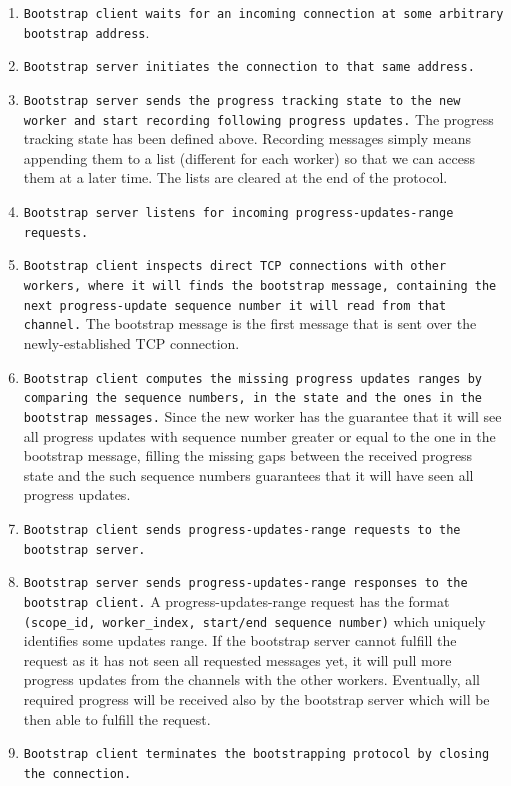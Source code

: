 \documentclass[12pt]{extarticle}
\begin{document}
\begin{enumerate}
    \item \texttt{Bootstrap client waits for an incoming connection at some arbitrary bootstrap address}.

    \item \texttt{Bootstrap server initiates the connection to that same address.}

    \item \texttt{Bootstrap server sends the progress tracking state to the new worker and start recording following progress updates.}
        The progress tracking state has been defined above. Recording messages simply means appending them to a list (different for each worker)
        so that we can access them at a later time. The lists are cleared at the end of the protocol.

    \item \texttt{Bootstrap server listens for incoming progress-updates-range requests.}

    \item \texttt{Bootstrap client inspects direct TCP connections with other workers, where it will finds the bootstrap message, containing the next progress-update sequence number it will read from that channel.}
        The bootstrap message is the first message that is sent over the newly-established TCP connection.

    \item \texttt{Bootstrap client computes the missing progress updates ranges by comparing the sequence numbers, in the state and the ones in the bootstrap messages.}
        Since the new worker has the guarantee that it will see all progress updates with sequence number greater or equal to the one in the bootstrap
        message, filling the missing gaps between the received progress state and the such sequence numbers guarantees that it will have seen all
        progress updates.

    \item \texttt{Bootstrap client sends progress-updates-range requests to the bootstrap server.}

    \item \texttt{Bootstrap server sends progress-updates-range responses to the bootstrap client.}
        A progress-updates-range request has the format \texttt{(scope\_id, worker\_index, start/end sequence number)}
        which uniquely identifies some updates range. If the bootstrap server cannot fulfill the request
        as it has not seen all requested messages yet, it will pull more progress updates from the channels with the other workers.
        Eventually, all required progress will be received also by the bootstrap server which
        will be then able to fulfill the request.

    \item \texttt{Bootstrap client terminates the bootstrapping protocol by closing the connection.}

\end{enumerate}
\end{document}
